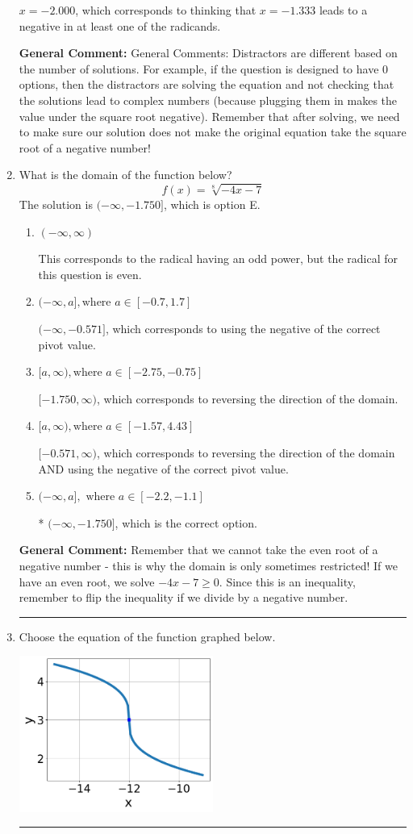 \documentclass{extbook}[14pt]
\newcommand{\litem}[1]{\item #1

\rule{\textwidth}{0.4pt}}
\begin{document}
\begin{enumerate}
{\begin{enumerate}[label=\Alph*.]
$x = -2.000$, which corresponds to thinking that $x = -1.333$ leads to a negative in at least one of the radicands.
\end{enumerate}

\textbf{General Comment:} General Comments: Distractors are different based on the number of solutions. For example, if the question is designed to have 0 options, then the distractors are solving the equation and not checking that the solutions lead to complex numbers (because plugging them in makes the value under the square root negative). Remember that after solving, we need to make sure our solution does not make the original equation take the square root of a negative number!
}
\litem{
What is the domain of the function below?
\[ f(x) = \sqrt[8]{-4 x - 7} \]The solution is \( (-\infty, -1.750] \), which is option E.\begin{enumerate}[label=\Alph*.]
\item \( (-\infty, \infty) \)

This corresponds to the radical having an odd power, but the radical for this question is even.
\item \( (-\infty, a], \text{where } a \in [-0.7, 1.7] \)

$(-\infty, -0.571]$, which corresponds to using the negative of the correct pivot value.
\item \( [a, \infty), \text{where } a \in [-2.75, -0.75] \)

 $[-1.750, \infty)$, which corresponds to reversing the direction of the domain.
\item \( [a, \infty), \text{where } a \in [-1.57, 4.43] \)

$[-0.571, \infty)$, which corresponds to reversing the direction of the domain AND using the negative of the correct pivot value.
\item \( (-\infty, a], \text{ where } a \in [-2.2, -1.1] \)

* $(-\infty, -1.750]$, which is the correct option.
\end{enumerate}

\textbf{General Comment:} Remember that we cannot take the even root of a negative number - this is why the domain is only sometimes restricted! If we have an even root, we solve $-4 x - 7 \geq 0$. Since this is an inequality, remember to flip the inequality if we divide by a negative number.
}
\litem{
Choose the equation of the function graphed below.

\begin{center}
    \includegraphics[width=0.5\textwidth]{../Figures/radicalGraphToEquationC.png}
\end{center}


}
\end{enumerate}
\end{document}
